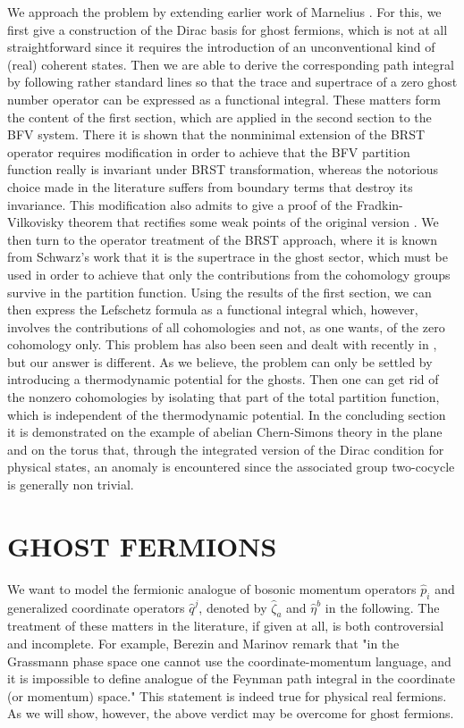 \documentclass[a4paper,10pt]{article}
\begin{document}
We approach the problem by extending earlier work of Marnelius \cite{Marn 87}. For this, 
we first give a construction of the Dirac basis for ghost fermions, which is not at all 
straightforward since it requires the introduction of an unconventional kind of (real) 
coherent states. Then we are able to derive the corresponding path integral by following 
rather standard lines so that the trace and supertrace of a zero ghost number operator 
can be expressed as a functional integral. These matters form the content of the first 
section, which are applied in the second section to the BFV system. There it is shown 
that the nonminimal extension of the BRST operator requires modification in order to 
achieve that the BFV partition function really is invariant under BRST transformation, 
whereas the notorious choice made in the literature \cite{Frad 75,Henn 92} suffers from 
boundary terms \cite{Henn 85,Henn 92,Henn 92a} that destroy its invariance. This 
modification also admits to give a proof of the Fradkin-Vilkovisky \cite{Frad 75} theorem that 
rectifies some weak points of the original version \cite{Bata 77}. We then turn to the 
operator treatment of the BRST approach, where it is known from Schwarz's work \cite{Schw 
89} that it is the supertrace in the ghost sector, which must be used in order to achieve  
that only the contributions from the cohomology groups survive in the partition function.  
Using the results of the first section, we can then express the Lefschetz formula as a 
functional integral which, however, involves the contributions of all cohomologies and 
not, as one wants, of the zero cohomology only. This problem has also been seen and dealt 
with recently in \cite{Roge 97}, but our answer is different. As we believe, the problem 
can only be settled by introducing a thermodynamic potential for the ghosts. Then one can 
get rid of the nonzero cohomologies by isolating that part of the total partition 
function, which is independent of the thermodynamic potential. In the concluding section 
it is demonstrated on the example of abelian Chern-Simons theory in the plane and on the 
torus that, through the integrated version of the Dirac condition for physical states, an 
anomaly \cite{Trei 85} is encountered since the associated group two-cocycle is generally 
non trivial.

\section{GHOST FERMIONS}

We want to model the fermionic analogue of bosonic momentum operators $\hat{p}_i$ and 
generalized coordinate operators $\hat{q}^j$, denoted by $\hat{\zeta}_a$ and 
$\hat{\eta}^b$ in the following. The treatment of these matters in the literature, if 
given at all, is both controversial and incomplete. For example, Berezin and Marinov 
\cite{Bere 77} remark that "in the Grassmann phase space one cannot use the 
coordinate-momentum language, and it is impossible to define analogue of the Feynman 
path integral in the coordinate (or momentum) space." This statement is indeed true for 
physical real 
fermions. As we will show, however, the above verdict may be overcome for ghost fermions. 
\end{document}
